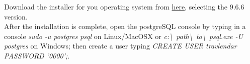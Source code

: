 Download the installer for you operating system from \href{https://www.enterprisedb.com/downloads/postgres-postgresql-downloads#linux}{here}, selecting the 9.6.6 version. \\
After the installation is complete, open the postgreSQL console by typing in a console \emph{sudo -u postgres psql} on Linux/MacOSX or \emph{c:\textbackslash~path\textbackslash~to\textbackslash~psql.exe -U postgres} on Windows; then create a user typing \emph{CREATE USER travlendar PASSWORD '0000';}.
